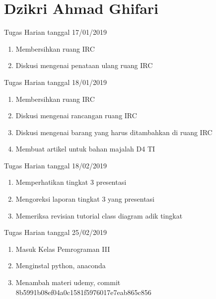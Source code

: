 \chapter{Dzikri Ahmad Ghifari}

Tugas Harian tanggal 17/01/2019
\begin{enumerate}
\item Membersihkan ruang IRC
\item Diskusi mengenai penataan ulang ruang IRC
\end{enumerate}

Tugas Harian tanggal 18/01/2019
\begin{enumerate}
\item Membersihkan ruang IRC
\item Diskusi mengenai rancangan ruang IRC
\item Diskusi mengenai barang yang harus ditambahkan di ruang IRC
\item Membuat artikel untuk bahan majalah D4 TI
\end{enumerate}

Tugas Harian tanggal 18/02/2019
\begin{enumerate}
\item Memperhatikan tingkat 3 presentasi
\item Mengoreksi laporan tingkat 3 yang presentasi
\item Memeriksa revisian tutorial class diagram adik tingkat
\end{enumerate}

Tugas Harian tanggal 25/02/2019
\begin{enumerate}
\item Masuk Kelas Pemrograman III
\item Menginstal python, anaconda
\item Menambah materi udemy, commit 8b5991b08ef04a0c1581f5976017e7eab865c856
\end{enumerate}




